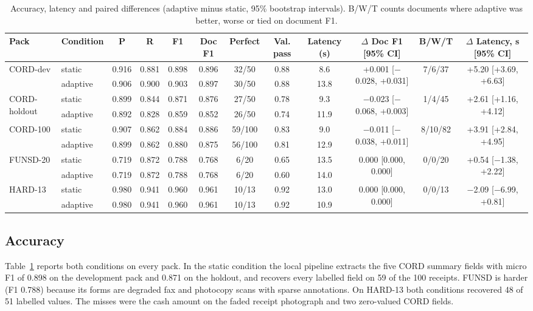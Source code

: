 \documentclass[conference,a4paper]{IEEEtran}
\begin{document}
\begin{table}[t]
\caption{Accuracy, latency and paired differences (adaptive minus static, 95\% bootstrap intervals). B/W/T counts documents where adaptive was better, worse or tied on document F1.}
\label{tab:results}
\centering
\footnotesize
\setlength{\tabcolsep}{3pt}
\begin{tabular}{llcccccccccc}
\toprule
Pack & Condition & P & R & F1 & Doc F1 & Perfect & Val. pass & Latency (s) & $\Delta$ Doc F1 [95\% CI] & B/W/T & $\Delta$ Latency, s [95\% CI]\\
\midrule
\multirow{2}{*}{CORD-dev} & static & 0.916 & 0.881 & 0.898 & 0.896 & 32/50 & 0.88 & 8.6 & \multirow{2}{*}{+0.001 [$-$0.028, +0.031]} & \multirow{2}{*}{7/6/37} & \multirow{2}{*}{+5.20 [+3.69, +6.63]}\\
 & adaptive & 0.906 & 0.900 & 0.903 & 0.897 & 30/50 & 0.88 & 13.8 & & & \\
\midrule
\multirow{2}{*}{CORD-holdout} & static & 0.899 & 0.844 & 0.871 & 0.876 & 27/50 & 0.78 & 9.3 & \multirow{2}{*}{$-$0.023 [$-$0.068, +0.003]} & \multirow{2}{*}{1/4/45} & \multirow{2}{*}{+2.61 [+1.16, +4.12]}\\
 & adaptive & 0.892 & 0.828 & 0.859 & 0.852 & 26/50 & 0.74 & 11.9 & & & \\
\midrule
\multirow{2}{*}{CORD-100} & static & 0.907 & 0.862 & 0.884 & 0.886 & 59/100 & 0.83 & 9.0 & \multirow{2}{*}{$-$0.011 [$-$0.038, +0.011]} & \multirow{2}{*}{8/10/82} & \multirow{2}{*}{+3.91 [+2.84, +4.95]}\\
 & adaptive & 0.899 & 0.862 & 0.880 & 0.875 & 56/100 & 0.81 & 12.9 & & & \\
\midrule
\multirow{2}{*}{FUNSD-20} & static & 0.719 & 0.872 & 0.788 & 0.768 & 6/20 & 0.65 & 13.5 & \multirow{2}{*}{0.000 [0.000, 0.000]} & \multirow{2}{*}{0/0/20} & \multirow{2}{*}{+0.54 [$-$1.38, +2.22]}\\
 & adaptive & 0.719 & 0.872 & 0.788 & 0.768 & 6/20 & 0.60 & 14.0 & & & \\
\midrule
\multirow{2}{*}{HARD-13} & static & 0.980 & 0.941 & 0.960 & 0.961 & 10/13 & 0.92 & 13.0 & \multirow{2}{*}{0.000 [0.000, 0.000]} & \multirow{2}{*}{0/0/13} & \multirow{2}{*}{$-$2.09 [$-$6.99, +0.81]}\\
 & adaptive & 0.980 & 0.941 & 0.960 & 0.961 & 10/13 & 0.92 & 10.9 & & & \\
\bottomrule
\end{tabular}
\end{table}

\subsection{Accuracy}
Table~\ref{tab:results} reports both conditions on every pack. In the static condition the local pipeline extracts the five CORD summary fields with micro F1 of 0.898 on the development pack and 0.871 on the holdout, and recovers every labelled field on 59 of the 100 receipts. FUNSD is harder (F1 0.788) because its forms are degraded fax and photocopy scans with sparse annotations. On HARD-13 both conditions recovered 48 of 51 labelled values. The misses were the cash amount on the faded receipt photograph and two zero-valued CORD fields.
\end{document}
